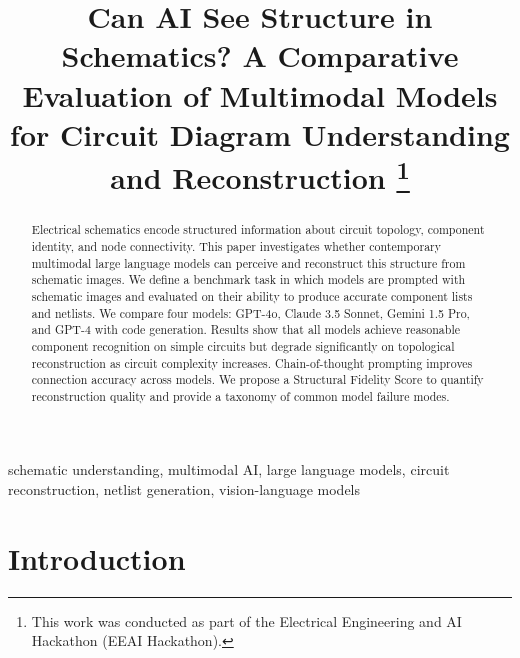 \documentclass[conference]{IEEEtran}
\begin{document}
\title{Can AI See Structure in Schematics? A Comparative Evaluation of Multimodal Models for Circuit Diagram Understanding and Reconstruction
\thanks{This work was conducted as part of the Electrical Engineering and AI Hackathon (EEAI Hackathon).}
}

\author{
\and
{}
\and
{}
}

\maketitle

\begin{abstract}
Electrical schematics encode structured information about circuit topology, component identity, and node connectivity. This paper investigates whether contemporary multimodal large language models can perceive and reconstruct this structure from schematic images. We define a benchmark task in which models are prompted with schematic images and evaluated on their ability to produce accurate component lists and netlists. We compare four models: GPT-4o, Claude 3.5 Sonnet, Gemini 1.5 Pro, and GPT-4 with code generation. Results show that all models achieve reasonable component recognition on simple circuits but degrade significantly on topological reconstruction as circuit complexity increases. Chain-of-thought prompting improves connection accuracy across models. We propose a Structural Fidelity Score to quantify reconstruction quality and provide a taxonomy of common model failure modes.
\end{abstract}

\begin{IEEEkeywords}
schematic understanding, multimodal AI, large language models, circuit reconstruction, netlist generation, vision-language models
\end{IEEEkeywords}

\section{Introduction}
\end{document}

